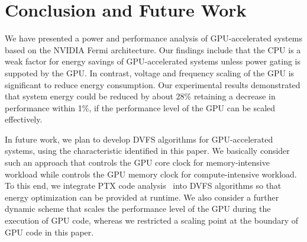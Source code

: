 \section{Conclusion and Future Work}
\label{sec:conclusion}

We have presented a power and performance analysis of GPU-accelerated
systems based on the NVIDIA Fermi architecture.
Our findings include that the CPU is a weak factor for energy savings of
GPU-accelerated systems unless power gating is suppoted by the GPU.
In contrast, voltage and frequency scaling of the GPU is significant to
reduce energy consumption.
Our experimental results demonstrated that system energy could be reduced
by about 28\% retaining a decrease in performance within 1\%, if the
performance level of the GPU can be scaled effectively.

In future work, we plan to develop DVFS algorithms for GPU-accelerated
systems, using the characteristic identified in this paper.
We basically consider such an approach that controls the GPU core clock
for memory-intensive workload while controls the GPU memory clock for
compute-intensive workload.
To this end, we integrate PTX code analysis~\cite{Hong2009,Hong2010}
into DVFS algorithms so that energy optimization can be provided at
runtime.
We also consider a further dynamic scheme that scales the performance
level of the GPU during the execution of GPU code, whereas we restricted
a scaling point at the boundary of GPU code in this paper.